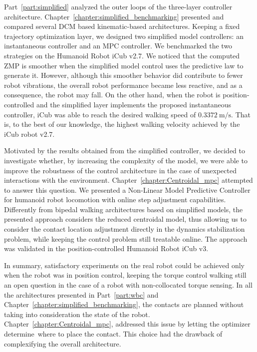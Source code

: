 \par
Part~\ref{part:simplified} analyzed the outer loops of the three-layer controller architecture.
Chapter~\ref{chapter:simplified_benchmarking} presented and compared several DCM based kinematic-based architectures. Keeping a fixed trajectory optimization layer, we designed two simplified model controllers: an instantaneous controller and an MPC controller.
We benchmarked the two strategies on the Humanoid Robot iCub v2.7. We noticed that the computed ZMP is smoother when the simplified model control uses the predictive law to generate it. However, although this smoother behavior did contribute to fewer robot vibrations, the overall robot performance became less reactive, and as a consequence, the robot may fall. On the other hand, when the robot is position-controlled and the simplified layer implements the proposed instantaneous controller, iCub was able to reach the desired walking speed of $\SI{0.3372}{\meter\per\second}$. That is, to the best of our knowledge, the highest walking velocity achieved by the iCub robot v2.7.
\par
Motivated by the results obtained from the simplified controller, we decided to investigate whether, by increasing the complexity of the model, we were able to improve the robustness of the control architecture in the case of unexpected interactions with the environment. Chapter~\ref{chapter:Centroidal_mpc} attempted to answer this question. We presented a Non-Linear Model Predictive Controller for humanoid robot locomotion with online step adjustment capabilities. Differently from bipedal walking architectures based on simplified models, the presented approach considers the reduced centroidal model, thus allowing us to consider the contact location adjustment directly in the dynamics stabilization problem, while keeping the control problem still treatable online. The approach was validated in the position-controlled Humanoid Robot iCub v3.
\par
In summary, satisfactory experiments on the real robot could be achieved only when the robot was in position control, keeping the torque control walking still an open question in the case of a robot with non-collocated torque sensing.
In all the architectures presented in Part~\ref{part:wbc} and Chapter~\ref{chapter:simplified_benchmarking}, the contacts are planned without taking into consideration the state of the robot. Chapter~\ref{chapter:Centroidal_mpc}, addressed this issue by letting the optimizer determine where to place the contact. This choice had the drawback of complexifying the overall architecture.
